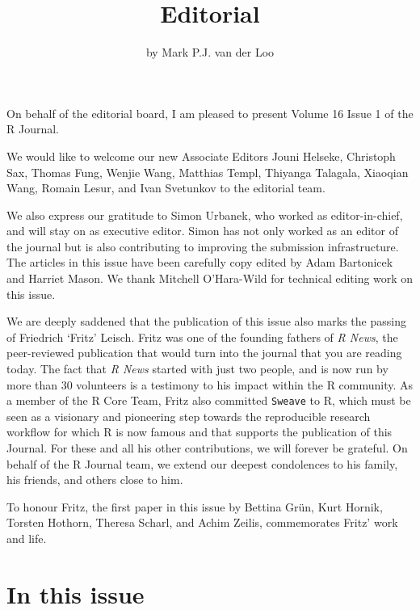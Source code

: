 \title{Editorial}


\author{by Mark P.J. van der Loo}

\maketitle


On behalf of the editorial board, I am pleased to present Volume 16 Issue 1 of
the R Journal.

We would like to welcome our new Associate Editors Jouni Helseke, Christoph
Sax, Thomas Fung, Wenjie Wang, Matthias Templ, Thiyanga Talagala, Xiaoqian
Wang, Romain Lesur, and Ivan Svetunkov to the editorial team.

We also express our gratitude to Simon Urbanek, who worked as editor-in-chief,
and will stay on as executive editor. Simon has not only worked as an editor of
the journal but is also contributing to improving the submission
infrastructure. The articles in this issue have been carefully copy edited by
Adam Bartonicek and Harriet Mason. We thank Mitchell O'Hara-Wild for technical
editing work on this issue.

We are deeply saddened that the publication of this issue also marks the passing
of Friedrich `Fritz' Leisch. Fritz was one of the founding fathers of \emph{R News},
the peer-reviewed publication that would turn into the journal that you are
reading today. The fact that \emph{R News} started with just two people, and is now
run by more than 30 volunteers is a testimony to his impact within the R community.
As a member of the R Core Team, Fritz also committed \texttt{Sweave} to R, which must
be seen as a visionary and pioneering step towards the reproducible research
workflow for which R is now famous and that supports the publication of this
Journal. For these and all his other contributions, we will forever be
grateful. On behalf of the R Journal team, we extend our deepest
condolences to his family, his friends, and others close to him.

To honour Fritz, the first paper in this issue by Bettina Grün, Kurt Hornik,
Torsten Hothorn, Theresa Scharl, and Achim Zeilis, commemorates Fritz' work and
life.

\section*{In this issue}\label{in-this-issue}

